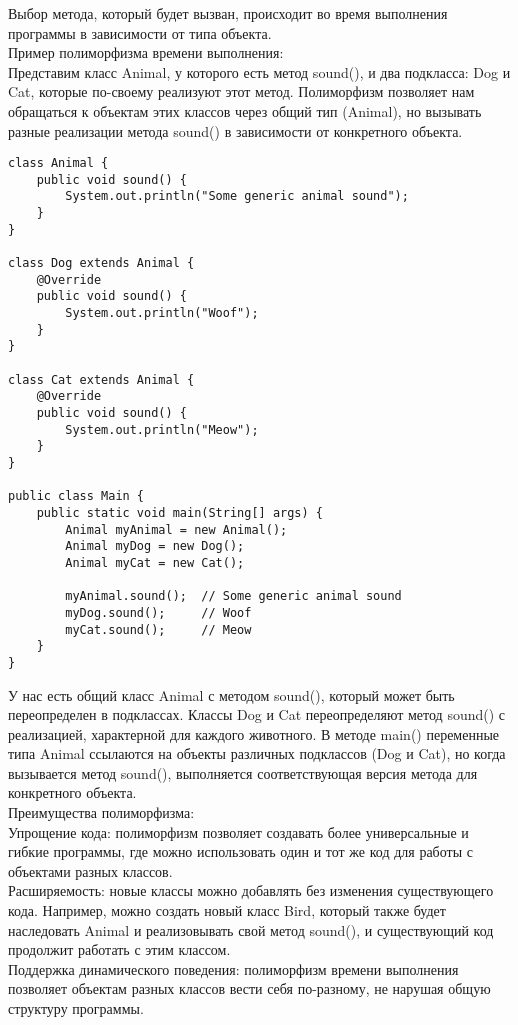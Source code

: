 Выбор метода, который будет вызван, происходит во время выполнения программы в зависимости от типа объекта. \\
Пример полиморфизма времени выполнения: \\
Представим класс Animal, у которого есть метод sound(), и два подкласса: Dog и Cat, которые по-своему реализуют этот метод. Полиморфизм позволяет нам обращаться к объектам этих классов через общий тип (Animal), но вызывать разные реализации метода sound() в зависимости от конкретного объекта. \\
\begin{lstlisting}
class Animal {
    public void sound() {
        System.out.println("Some generic animal sound");
    }
}

class Dog extends Animal {
    @Override
    public void sound() {
        System.out.println("Woof");
    }
}

class Cat extends Animal {
    @Override
    public void sound() {
        System.out.println("Meow");
    }
}

public class Main {
    public static void main(String[] args) {
        Animal myAnimal = new Animal();  
        Animal myDog = new Dog();         
        Animal myCat = new Cat();        

        myAnimal.sound();  // Some generic animal sound
        myDog.sound();     // Woof
        myCat.sound();     // Meow
    }
}
\end{lstlisting}
У нас есть общий класс Animal с методом sound(), который может быть переопределен в подклассах. Классы Dog и Cat переопределяют метод sound() с реализацией, характерной для каждого животного. В методе main() переменные типа Animal ссылаются на объекты различных подклассов (Dog и Cat), но когда вызывается метод sound(), выполняется соответствующая версия метода для конкретного объекта. \\
Преимущества полиморфизма: \\
Упрощение кода: полиморфизм позволяет создавать более универсальные и гибкие программы, где можно использовать один и тот же код для работы с объектами разных классов. \\
Расширяемость: новые классы можно добавлять без изменения существующего кода. Например, можно создать новый класс Bird, который также будет наследовать Animal и реализовывать свой метод sound(), и существующий код продолжит работать с этим классом. \\
Поддержка динамического поведения: полиморфизм времени выполнения позволяет объектам разных классов вести себя по-разному, не нарушая общую структуру программы. \\
